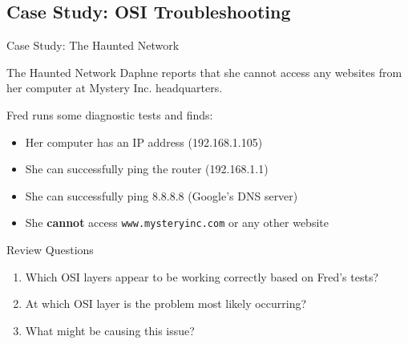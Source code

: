 \documentclass[aspectratio=169]{beamer}  %
\begin{document}
\subsection{Case Study: OSI Troubleshooting}

\begin{frame}{Case Study: The Haunted Network}
    \begin{casestudy}{The Haunted Network}
        Daphne reports that she cannot access any websites from her computer at Mystery Inc. headquarters.
        
        \vspace{0.5em}
        Fred runs some diagnostic tests and finds:
        \begin{itemize}
            \item Her computer has an IP address (192.168.1.105)
            \item She can successfully ping the router (192.168.1.1)
            \item She can successfully ping 8.8.8.8 (Google's DNS server)
            \item She \textbf{cannot} access \texttt{www.mysteryinc.com} or any other website
        \end{itemize}
    \end{casestudy}
    
    \begin{block}{Review Questions}
        \begin{enumerate}
            \item Which OSI layers appear to be working correctly based on Fred's tests?
            \item At which OSI layer is the problem most likely occurring?
            \item What might be causing this issue?
        \end{enumerate}
    \end{block}
\end{frame}
\end{document}

